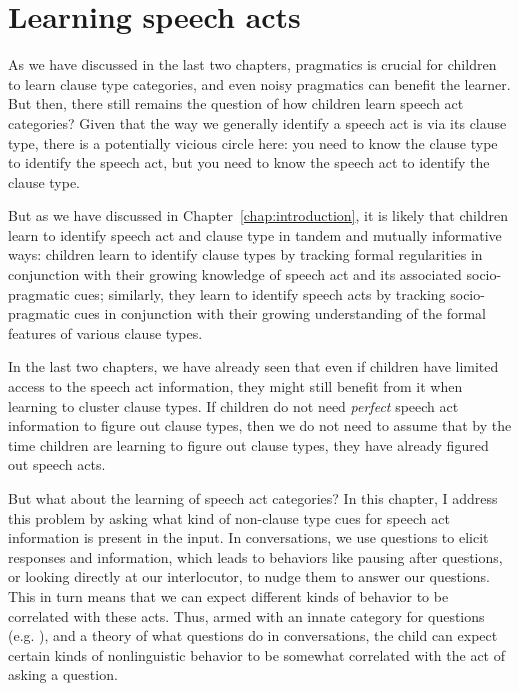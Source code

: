\chapter{Learning speech acts}
\label{chap:eng-sp}

As we have discussed in the last two chapters, pragmatics is crucial for children to learn clause type categories, and even noisy pragmatics can benefit the learner. But then, there still remains the question of how children learn speech act categories? Given that the way we generally identify a speech act is via its clause type, there is a potentially vicious circle here: you need to know the clause type to identify the speech act, but you need to know the speech act to identify the clause type. %

But as we have discussed in Chapter~\ref{chap:introduction}, it is likely that children learn to identify speech act and clause type in tandem and mutually informative ways: children learn to identify clause types by tracking formal regularities in conjunction with their growing
knowledge of speech act and its associated socio-pragmatic cues; similarly, they learn
to identify speech acts by tracking socio-pragmatic cues in conjunction with their growing
understanding of the formal features of various clause types.


In the last two chapters, we have already seen that even if children have limited access to the speech act information, they might still benefit from it when learning to cluster clause types. If children do not need \emph{perfect} speech act information to figure out clause types, then we do not need to assume that by the time children are learning to figure out clause types, they have already figured out speech acts. 

But what about the learning of speech act categories? In this chapter, I address this problem by
asking what kind of non-clause type cues for speech act information is present in the input. In conversations, we use questions to elicit responses and information, which leads to behaviors like pausing after questions, or looking directly at our interlocutor, to nudge them to answer our questions. 
This in turn means that we can expect different kinds of behavior to be correlated with these acts. Thus, armed with an innate category for questions (e.g. \cite{carruthers2018q}), and a theory of what questions do in conversations, the child can expect certain kinds of nonlinguistic behavior to be somewhat correlated with the act of asking a question. 


